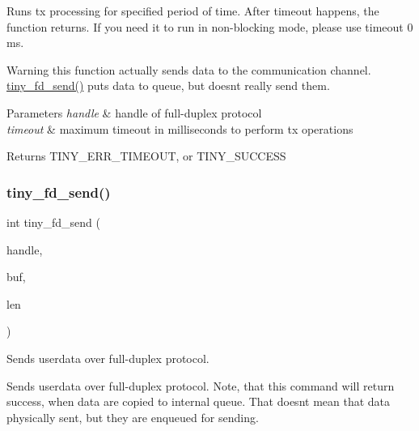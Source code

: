 Runs tx processing for specified period of time. After timeout happens, the function returns. If you need it to run in non-\/blocking mode, please use timeout 0 ms.

\begin{DoxyWarning}{Warning}
this function actually sends data to the communication channel. \hyperlink{group__FULL__DUPLEX__API_ga490157ee98ea6148f99a5bb1f26c5f60}{tiny\+\_\+fd\+\_\+send()} puts data to queue, but doesn\textquotesingle{}t really send them.
\end{DoxyWarning}

\begin{DoxyParams}{Parameters}
{\em handle} & handle of full-\/duplex protocol \\
\hline
{\em timeout} & maximum timeout in milliseconds to perform tx operations \\
\hline
\end{DoxyParams}
\begin{DoxyReturn}{Returns}
T\+I\+N\+Y\+\_\+\+E\+R\+R\+\_\+\+T\+I\+M\+E\+O\+UT, or T\+I\+N\+Y\+\_\+\+S\+U\+C\+C\+E\+SS 
\end{DoxyReturn}
\mbox{\label{group__FULL__DUPLEX__API_ga490157ee98ea6148f99a5bb1f26c5f60}} 
\subsubsection{\texorpdfstring{tiny\+\_\+fd\+\_\+send()}{tiny\_fd\_send()}}
{\footnotesize\ttfamily int tiny\+\_\+fd\+\_\+send (\begin{DoxyParamCaption}\item[{\hyperlink{group__FULL__DUPLEX__API_ga91e6b79431fe38570fb102701ef0b7e8}{tiny\+\_\+fd\+\_\+handle\+\_\+t}}]{handle,  }\item[{const void $\ast$}]{buf,  }\item[{int}]{len }\end{DoxyParamCaption})}



Sends userdata over full-\/duplex protocol. 

Sends userdata over full-\/duplex protocol. Note, that this command will return success, when data are copied to internal queue. That doesn\textquotesingle{}t mean that data physically sent, but they are enqueued for sending.

